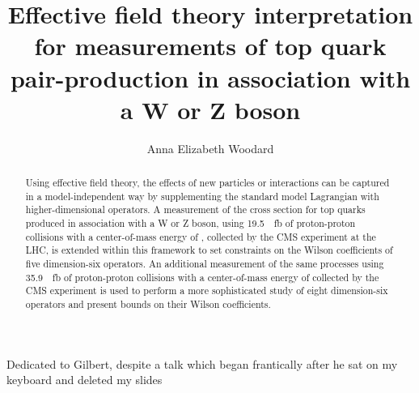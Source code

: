 \documentclass[noinfo,final,nonatbib]{nddiss2e}
\title{Effective field theory interpretation for measurements of top quark
pair-production in association with a W or Z boson}
\author{Anna Elizabeth Woodard}
\begin{document}
\frontmatter
\maketitle
\makecopyright

\begin{abstract}
  Using effective field theory, the effects of new particles or interactions can
  be captured in a model-independent way by supplementing the standard model
  Lagrangian with higher-dimensional operators. A measurement of the cross
  section for top quarks produced in association with a W or Z boson, using
  \SI{19.5}{\per\femto\barn} of proton-proton collisions with a center-of-mass energy of
  \eightTeV, collected by the CMS experiment at the LHC, is extended within this
  framework to set constraints on the Wilson coefficients of five dimension-six
  operators. An additional measurement of the same processes using
  \SI{35.9}{\per\femto\barn} of proton-proton collisions with a center-of-mass energy of
  \thirteenTeV collected by the CMS experiment is used to perform a more
  sophisticated study of eight dimension-six operators and present bounds on
  their Wilson coefficients.
\end{abstract}

\begin{dedication}
  Dedicated to Gilbert,
  despite a talk which began frantically after he sat
  on my keyboard and deleted my slides
\end{dedication}

\tableofcontents
\listoffigures
\listoftables
\end{document}
